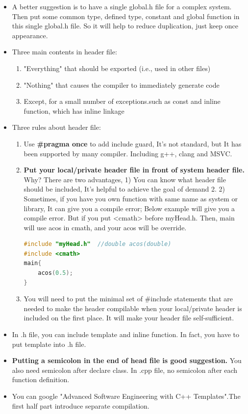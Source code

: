 \documentclass[a4paper,12pt,twoside]{book}
\begin{document}
\begin{itemize}
	\item A better suggestion is to have a single global.h file for a complex system. Then put some common type, defined type, constant and global function in this single global.h file. So it will help to reduce duplication, just keep once appearance.
	
	\item Three main contents in header file:
	\begin{enumerate}
		\item "Everything" that should be exported (i.e., used in other files)
		
		\item "Nothing" that causes the compiler to immediately generate code
		
		\item Except, for a small number of exceptions.such as const and inline function, which has inline linkage
	\end{enumerate}
	
	\item Three rules about header file:
	
	\begin{enumerate}
		\item Use \textbf{\#pragma once} to add include guard, It's not standard, but It has been supported by many compiler. Including g++, clang and MSVC.
		
		\item \textbf{Put your local/private header file in front of system header file. }  Why? There are two advantages, 1) You can know what header file should be included, It's helpful to achieve the goal of demand 2.  2) Sometimes, if you have you own function with same name as system or library, It can give you a compile error; Below example will give you a compile error. But if you put <cmath> before myHead.h. Then, main will use acos in cmath, and your acos will be override.
		
\begin{lstlisting}[frame=single, language=c++]
#include "myHead.h"  //double acos(double)
#include <cmath>
main{
	acos(0.5);
}
\end{lstlisting}
		
		\item You will need to put the minimal set of \#include statements that are needed to make the header compilable when your local/private header is included on the first place.  It will make your header file self-sufficient.
	\end{enumerate}
	
	\item In .h file, you can include template and inline function.  In fact, you have to put template into .h file. 
	
	\item \textbf{Putting a semicolon in the end of head file is good suggestion.} You also need semicolon after declare class. In .cpp file, no semicolon after each function definition.
	
	\item You can google "Advanced Software Engineering with C++ Templates".The first half part introduce separate compilation.
\end{itemize}
\end{document}
